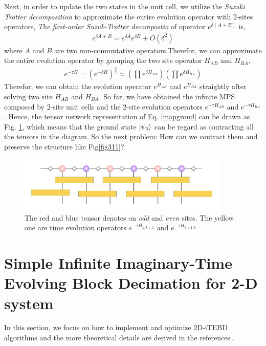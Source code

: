 Next, in order to update the two states in the unit cell, we utilize the \textit{Suzuki Trotter decomposition} to approximate the entire evolution operator with $2$-sites operators, \textit{The first-order Suzuk-Trotter decompostio} of operator $e^{\delta (A+B)}$ is,
\begin{align}
	\label{STd}
	e^{\delta A + B} = e^{\delta A}e^{\delta B} + O(\delta^2)
\end{align}
where $A$ and $B$ are two non-commutative operators.Therefor, we can approximate the entire evolution operator by grouping the two site operator $H_{AB}$ and $H_{BA}$,
\begin{align}
	\label{evoopt}
	e^{-\tau H} = \left(e^{-\delta H}\right)^{\frac{\tau}{\delta}} \approx \left(\prod e^{\delta H_{AB}} \right)\left( \prod e^{\delta H_{BA}}\right)
\end{align}
Therefor, we can obtain the evolution operator $e^{H_{AB}}$ and $e^{H_{BA}}$ straightly after solving two site $H_{AB}$ and $H_{BA}$.
So far, we have obtained the infinite MPS composed by 2-site unit cells and the 2-site evolution operators $e^{-\tau H_{AB}}$ and $e^{-\tau H_{BA}}$. Hence, the tensor network representation of Eq. \ref{mapgroud} can be drawn as Fig. \ref{fig313}, which means that the ground state $\Ket{\psi_0}$ can be regard as contracting all the tensors in the diagram. So the next problem: How can we contract them and preserve the structure like Fig{\ref{fig311}}?

\begin{figure}[ht]
	\centering
	\includegraphics[width=0.90\textwidth]{figures/fig312.png}
	\caption[The picture of the main idea of itebd.]{The red and blue tensor denotes on \textit{odd} and \textit{even} sites. The yellow one are time evolution operators $e^{-\tau H_{k,k+1}}$ and $e^{-\tau H_{k+1,k}}$}
	\label{fig313}
\end{figure}
\section{Simple Infinite Imaginary-Time Evolving Block Decimation for 2-D system}

In this section, we focus on how to implement and optimize 2D-iTEBD algorithms and the more theoretical details are derived in the references \cite{vidal_classical_2007} \cite{jiang_accurate_2008} \cite{orus_infinite_2008}.
\label{itebd}
